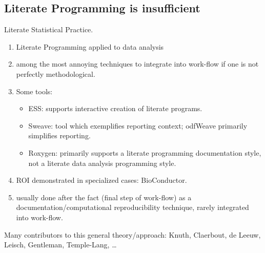 \documentclass{beamer}
\begin{document}
\subsection{Literate Programming is insufficient}

\begin{frame}{Literate Statistical Practice.}
  \begin{enumerate}
  \item Literate Programming applied to data analysis
  \item among the \alert{most annoying} techniques to integrate into
    work-flow if one is not perfectly methodological.
  \item Some tools:
    \begin{itemize}
    \item ESS: supports interactive creation of literate programs.
    \item Sweave: tool which exemplifies reporting context; odfWeave
      primarily simplifies reporting.
    \item Roxygen: primarily supports a literate programming
      documentation style, not a literate data analysis programming
      style. 
  \end{itemize}
  \item ROI demonstrated in specialized cases: BioConductor.
  \item \alert{usually done after the fact} (final step of work-flow)
    as a documentation/computational reproducibility technique, rarely
    integrated into work-flow.
  \end{enumerate}
  Many contributors to this general theory/approach:
  Knuth, Claerbout, de Leeuw, Leisch, Gentleman, Temple-Lang,
  \ldots{}
\end{frame}



\end{document}
